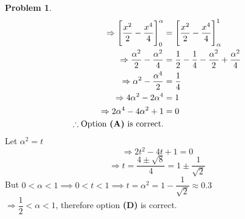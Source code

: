 \documentclass[14]{article}
\theoremstyle{definition}
\newtheorem{prob}{Problem}
\theoremstyle{case}
\begin{document}
\begin{prob}
\begin{align*}
\Rightarrow \left[ \dfrac{x^2}{2} - \dfrac{x^{4}}4 \right]_0^{\alpha} &= \left[ \dfrac{x^2}{2} - \dfrac{x^{4}}4 \right]_{\alpha}^1\\
\Rightarrow \dfrac{\alpha^2}{2} - \dfrac{\alpha^2}{4} &= \dfrac12 - \dfrac14 - \dfrac{\alpha^2}2 + \dfrac{\alpha^2}{4}\\
\Rightarrow \alpha^2 - \dfrac{\alpha^4}{2} &= \dfrac14\\
\Rightarrow 4\alpha^2 - 2\alpha^4 &= 1\\
\Rightarrow 2\alpha^4 - 4 \alpha^2 + 1 &= 0\\
\therefore \text{Option \textbf{(A)} is correct.}
\end{align*}
Let $\alpha^2 = t$
\[\Rightarrow 2t^2 - 4t + 1 = 0\]
\[\Rightarrow t = \dfrac{4 \pm \sqrt{8}}{4} = 1 \pm \dfrac1{\sqrt2}\]
But $0 < \alpha < 1 \implies 0 < t < 1 \implies t = \alpha^2 = 1 - \dfrac1{\sqrt2} \approx 0.3$\\
$\Rightarrow \dfrac12 < \alpha < 1$, therefore option \textbf{(D)} is correct.
\end{prob}
\pagebreak
\end{document}
